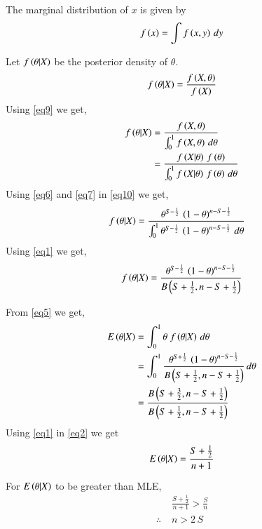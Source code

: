 \documentclass[journal,12pt,twocolumn]{IEEEtran}
\begin{document}
\begin{definition}
The marginal distribution of $x$ is given by
\begin{align}
    f\left(x\right) = \int f\left(x,y\right)\,dy\label{eq9}
\end{align}
\end{definition}
\begin{lemma}
Let $f\left(\theta|X\right)$ be the posterior density of $\theta$.
\begin{align}
    f\left(\theta|X\right) = \frac{f\left(X,\theta\right)}{f\left(X\right)}
\end{align}
Using \eqref{eq9} we get,
\begin{align}
    f\left(\theta|X\right) &= \frac{f\left(X,\theta\right)}{\int_0^1 f\left(X,\theta\right)\,d\theta} \nonumber\\
    &= \frac{f\left(X|\theta\right)\, f\left(\theta\right)}{\int_0^1 f\left(X|\theta\right)\, f\left(\theta\right)\,d\theta}\label{eq10}
\end{align}
Using \eqref{eq6} and \eqref{eq7} in \eqref{eq10} we get,
\begin{align}
    f\left(\theta|X\right) &= \frac{\theta^{S-\frac{1}{2}}\,\left(1-\theta\right)^{n-S-\frac{1}{2}}}{\int_0^1 \theta^{S-\frac{1}{2}}\,\left(1-\theta\right)^{n-S-\frac{1}{2}}\,d\theta}
\end{align}
Using \eqref{eq1} we get,
\begin{align}
    f\left(\theta|X\right) = \frac{\theta^{S-\frac{1}{2}}\,\left(1-\theta\right)^{n-S-\frac{1}{2}}}{B\left(S+\frac{1}{2},n-S+\frac{1}{2}\right)}
\end{align}

From \eqref{eq5} we get,
\begin{align}
    E\left(\theta|X\right) &= \int_0^1 \theta\;f\left(\theta|X\right)\,d\theta\nonumber\\
    &=\int_0^1 \frac{\theta^{S+\frac{1}{2}}\,\left(1-\theta\right)^{n-S-\frac{1}{2}}}{B\left(S+\frac{1}{2},n-S+\frac{1}{2}\right)}\,d\theta\nonumber\\
    &=\frac{B\left(S+\frac{3}{2},n-S+\frac{1}{2}\right)}{B\left(S+\frac{1}{2},n-S+\frac{1}{2}\right)}\label{eq2}
\end{align}
Using \eqref{eq1} in \eqref{eq2} we get
\begin{align}
    E\left(\theta|X\right) = \frac{S+\frac{1}{2}}{n+1}\label{eq3}
\end{align}
\end{lemma}
For $E\left(\theta|X\right)$ to be greater than MLE,
\begin{align}
    &\frac{S+\frac{1}{2}}{n+1} > \frac{S}{n}\nonumber\\
     \therefore\;&n>2\,S\label{eq4}
\end{align}
\end{document}
